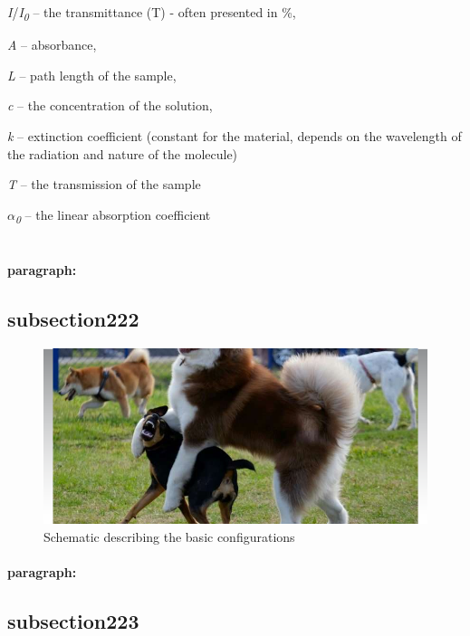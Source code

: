 \emph{I}/\emph{I\textsubscript{0}} -- the transmittance (T) - often
presented in \%,

\emph{A} -- absorbance,

\emph{L} -- path length of the sample,

\emph{c} -- the concentration of the solution,

\emph{k} -- extinction coefficient (constant for the material, depends
on the wavelength of the radiation and nature of the molecule)

\emph{T} -- the transmission of the sample

\emph{$\alpha$\textsubscript{0}} -- the linear absorption coefficient
\\
\\

\lipsum[1]
\paragraph{paragraph:}
\lipsum[1]
\subsection{subsection222}\label{subsection222}
\lipsum[1]

\begin{figure}[!htb]
	\centering
	\includegraphics[width=.95\linewidth]{img/fig1.png} \quad
	\caption
	{
	Schematic describing the basic configurations
	}\label{fig:ch03f1}
\end{figure}

\paragraph{paragraph:}
\lipsum[1]

\subsection{subsection223}\label{subsection223}
\lipsum[1-3]
